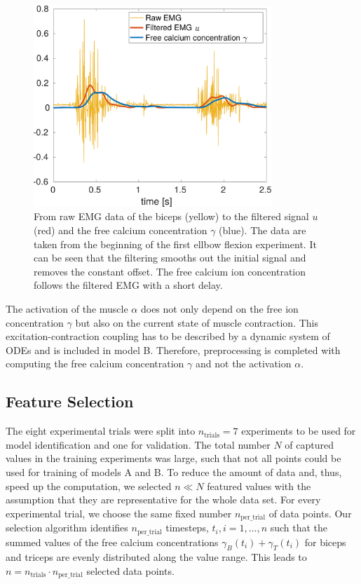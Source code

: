 \begin{figure}%
  \centering%
  \includegraphics[width=0.8\textwidth]{images/summer_school_study/emg_filtering.pdf}%
  \caption{From raw EMG data of the biceps (yellow) to the filtered signal $u$ (red) and the free calcium concentration $\gamma$ (blue). The data are taken from the beginning of the first ellbow flexion experiment. It can be seen that the filtering smooths out the initial signal and removes the constant offset. The free calcium ion concentration follows the filtered EMG with a short delay.}%
  \label{fig:emg_filtering}%
\end{figure}%

The activation of the muscle $\alpha$ does not only depend on the free ion concentration $\gamma$ but also on the current state of muscle contraction. This excitation-contraction coupling has to be described by a dynamic system of ODEs and is included in model B.
Therefore, preprocessing is completed with computing the free calcium concentration $\gamma$ and not the activation $\alpha$.

\subsection{Feature Selection} \label{sec:study_feature_selection}

The eight experimental trials were split into $n_\text{trials}=7$ experiments to be used for model identification and one for validation.
The total number $N$ of captured values in the training experiments was large, such that not all points could be used for training of models A and B.
To reduce the amount of data and, thus, speed up the computation, we selected $n \ll N$ featured values with the assumption that they are representative for the whole data set.
For every experimental trial, we choose the same fixed number $n_\text{per\_trial}$ of data points.
Our selection algorithm identifies $n_\text{per\_trial}$ timesteps, $t_i, i=1, \dots, n$ such that the summed values of the free calcium concentrations $\gamma_B(t_i) + \gamma_T(t_i)$ for biceps and triceps are evenly distributed along the value range.
This leads to $n = n_\text{trials} \cdot n_\text{per\_trial}$ selected data points.

